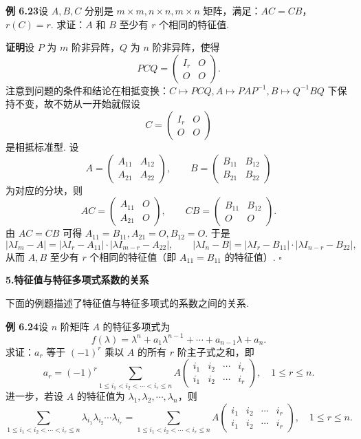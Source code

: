 \documentclass[UTF8,12pt,a4paper,fontset=fandol]{ctexart}
\begin{document}
\noindent\textbf{例 6.23}\quad 设 $A,B,C$ 分别是 $m\times m,n\times n,m\times n$ 矩阵，满足：$AC=CB$，$r(C)=r$. 求证：$A$ 和 $B$ 至少有 $r$ 个相同的特征值.

\noindent\textbf{证明}\quad 设 $P$ 为 $m$ 阶非异阵，$Q$ 为 $n$ 阶非异阵，使得
\[
PCQ=\left(\begin{array}{cc}
I_r & O\\
O & O
\end{array}\right).
\]
注意到问题的条件和结论在相抵变换：$C\mapsto PCQ,A\mapsto PAP^{-1},B\mapsto Q^{-1}BQ$ 下保持不变，故不妨从一开始就假设
\[
C=\left(\begin{array}{cc}
I_r & O\\
O & O
\end{array}\right)
\]
是相抵标准型. 设
\[
A=\left(\begin{array}{cc}
A_{11} & A_{12}\\
A_{21} & A_{22}
\end{array}\right),\qquad
B=\left(\begin{array}{cc}
B_{11} & B_{12}\\
B_{21} & B_{22}
\end{array}\right)
\]
为对应的分块，则
\[
AC=\left(\begin{array}{cc}
A_{11} & O\\
A_{21} & O
\end{array}\right),\qquad
CB=\left(\begin{array}{cc}
B_{11} & B_{12}\\
O & O
\end{array}\right).
\]
由 $AC=CB$ 可得 $A_{11}=B_{11},A_{21}=O,B_{12}=O$. 于是
\[
|\lambda I_m-A|=|\lambda I_r-A_{11}|\cdot|\lambda I_{m-r}-A_{22}|,\qquad
|\lambda I_n-B|=|\lambda I_r-B_{11}|\cdot|\lambda I_{n-r}-B_{22}|,
\]
从而 $A,B$ 至少有 $r$ 个相同的特征值（即 $A_{11}=B_{11}$ 的特征值）. $\square$

\noindent\textbf{5.\quad 特征值与特征多项式系数的关系}

下面的例题描述了特征值与特征多项式的系数之间的关系.

\noindent\textbf{例 6.24}\quad 设 $n$ 阶矩阵 $A$ 的特征多项式为
\[
f(\lambda)=\lambda^n+a_1\lambda^{n-1}+\cdots+a_{n-1}\lambda+a_n.
\]
求证：$a_r$ 等于 $(-1)^r$ 乘以 $A$ 的所有 $r$ 阶主子式之和，即
\[
a_r=(-1)^r\sum_{1\le i_1<i_2<\cdots<i_r\le n}
A\left(\begin{array}{cccc}
i_1 & i_2 & \cdots & i_r\\
i_1 & i_2 & \cdots & i_r
\end{array}\right),\quad 1\le r\le n.
\]
进一步，若设 $A$ 的特征值为 $\lambda_1,\lambda_2,\cdots,\lambda_n$，则
\[
\sum_{1\le i_1<i_2<\cdots<i_r\le n}
\lambda_{i_1}\lambda_{i_2}\cdots\lambda_{i_r}
=\sum_{1\le i_1<i_2<\cdots<i_r\le n}
A\left(\begin{array}{cccc}
i_1 & i_2 & \cdots & i_r\\
i_1 & i_2 & \cdots & i_r
\end{array}\right),\quad 1\le r\le n.
\]
\end{document}
